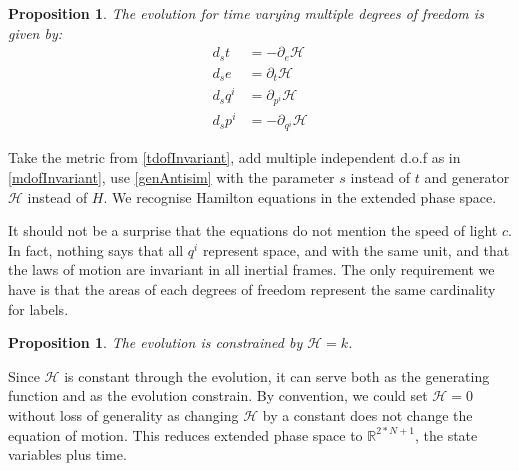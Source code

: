\documentclass[twocolumn,floatfix,nofootinbib]{revtex4}   %
\theoremstyle{theorem}
\newtheorem{prop}[thm]{Proposition}
\theoremstyle{definition}
\begin{document}
\begin{prop}\label{tdofHam}
The evolution for time varying multiple degrees of freedom is given by:
\begin{align*}
d_{s}t &= - \partial_{e} \mathcal{H} \\
d_{s}e &= \partial_{t} \mathcal{H} \\
d_{s}q^i &= \partial_{p^i} \mathcal{H} \\
d_{s}p^i &= - \partial_{q^i} \mathcal{H}
\end{align*}
\end{prop}

Take the metric from \ref{tdofInvariant}, add multiple independent d.o.f as in \ref{mdofInvariant}, use \ref{genAntisim} with the parameter $s$ instead of $t$ and generator $\mathcal{H}$ instead of $H$. We recognise Hamilton equations in the extended phase space.

It should not be a surprise that the equations do not mention the speed of light $c$. In fact, nothing says that all $q^i$ represent space, and with the same unit, and that the laws of motion are invariant in all inertial frames. The only requirement we have is that the areas of each degrees of freedom represent the same cardinality for labels.

\begin{prop}\label{tdofConstrain}
The evolution is constrained by $\mathcal{H}=k$.
\end{prop}

Since $\mathcal{H}$ is constant through the evolution, it can serve both as the generating function and as the evolution constrain. By convention, we could set $\mathcal{H}=0$ without loss of generality as changing $\mathcal{H}$ by a constant does not change the equation of motion. This reduces extended phase space to $\mathbb{R}^{2*N + 1}$, the state variables plus time.
\end{document}
